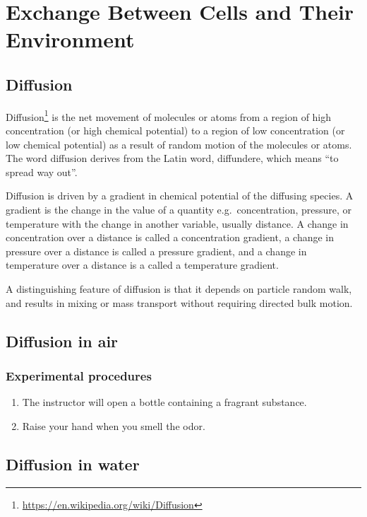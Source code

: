 \documentclass[]{book}
\providecommand{\tightlist}{%
  \setlength{\itemsep}{0pt}\setlength{\parskip}{0pt}}
\let\rmarkdownfootnote\footnote%
\def\footnote{\protect\rmarkdownfootnote}
\renewcommand{\href}[2]{#2\footnote{\url{#1}}}
\theoremstyle{definition}
\theoremstyle{definition}
\theoremstyle{definition}
\theoremstyle{remark}
\begin{document}
\chapter{Exchange Between Cells and Their
Environment}\label{exchange-between-cells-and-their-environment}

\section{Diffusion}\label{diffusion}

\href{https://en.wikipedia.org/wiki/Diffusion}{Diffusion} is the net
movement of molecules or atoms from a region of high concentration (or
high chemical potential) to a region of low concentration (or low
chemical potential) as a result of random motion of the molecules or
atoms. The word diffusion derives from the Latin word, diffundere, which
means ``to spread way out''.

Diffusion is driven by a gradient in chemical potential of the diffusing
species. A gradient is the change in the value of a quantity
e.g.~concentration, pressure, or temperature with the change in another
variable, usually distance. A change in concentration over a distance is
called a concentration gradient, a change in pressure over a distance is
called a pressure gradient, and a change in temperature over a distance
is a called a temperature gradient.

A distinguishing feature of diffusion is that it depends on particle
random walk, and results in mixing or mass transport without requiring
directed bulk motion.

\section{Diffusion in air}\label{diffusion-in-air}

\subsection{Experimental procedures}\label{experimental-procedures-13}

\begin{enumerate}
\def\labelenumi{\arabic{enumi}.}
\tightlist
\item
  The instructor will open a bottle containing a fragrant substance.
\item
  Raise your hand when you smell the odor.
\end{enumerate}

\section{Diffusion in water}\label{diffusion-in-water}
\end{document}

